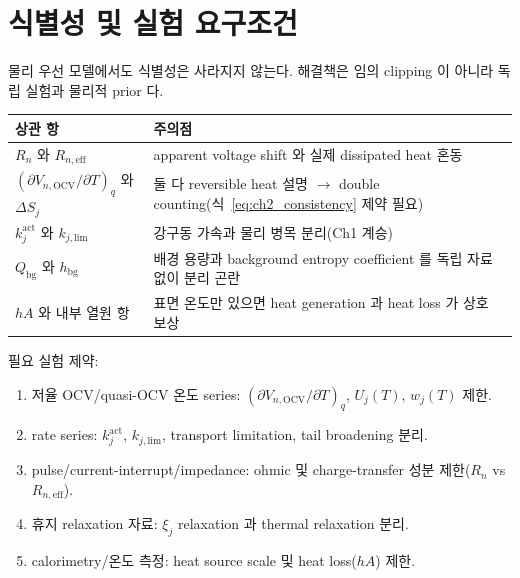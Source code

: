 \documentclass[11pt,a4paper]{article}
\newcommand{\eff}{\mathrm{eff}}
\newcommand{\bg}{\mathrm{bg}}
\newcommand{\OCV}{\mathrm{OCV}}
\begin{document}
\section{식별성 및 실험 요구조건}\label{sec:ch2_ident}
물리 우선 모델에서도 식별성은 사라지지 않는다. 해결책은 임의 clipping 이 아니라 독립 실험과 물리적 prior 다.
\begin{longtable}{p{} p{}}
\toprule 상관 항 & 주의점 \\ \midrule \endhead
$R_n$ 와 $R_{n,\eff}$ & apparent voltage shift 와 실제 dissipated heat 혼동 \\
$(\partial V_{n,\OCV}/\partial T)_q$ 와 $\Delta S_j$ & 둘 다 reversible heat 설명 $\to$ double counting(식~\eqref{eq:ch2_consistency} 제약 필요) \\
$k_j^{\mathrm{act}}$ 와 $k_{j,\mathrm{lim}}$ & 강구동 가속과 물리 병목 분리(Ch1 계승) \\
$Q_\bg$ 와 $h_\bg$ & 배경 용량과 background entropy coefficient 를 독립 자료 없이 분리 곤란 \\
$hA$ 와 내부 열원 항 & 표면 온도만 있으면 heat generation 과 heat loss 가 상호 보상 \\
\bottomrule
\end{longtable}
필요 실험 제약:
\begin{enumerate}[label=\arabic*),leftmargin=2.0em]
\item 저율 OCV/quasi-OCV 온도 series: $(\partial V_{n,\OCV}/\partial T)_q$, $U_j(T)$, $w_j(T)$ 제한.
\item rate series: $k_j^{\mathrm{act}}$, $k_{j,\mathrm{lim}}$, transport limitation, tail broadening 분리.
\item pulse/current-interrupt/impedance: ohmic 및 charge-transfer 성분 제한($R_n$ vs $R_{n,\eff}$).
\item 휴지 relaxation 자료: $\xi_j$ relaxation 과 thermal relaxation 분리.
\item calorimetry/온도 측정: heat source scale 및 heat loss($hA$) 제한.
\end{enumerate}

\end{document}

